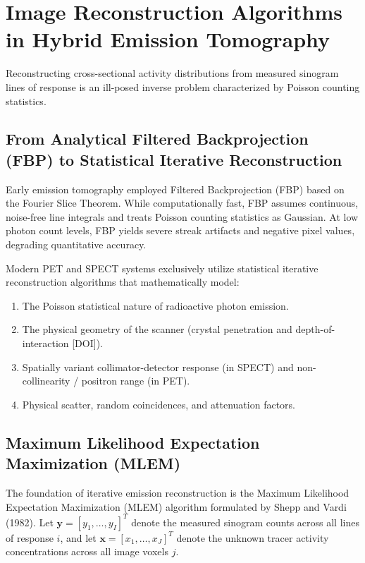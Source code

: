 \documentclass[11pt,a4paper]{article}
\begin{document}
\section{Image Reconstruction Algorithms in Hybrid Emission Tomography}
Reconstructing cross-sectional activity distributions from measured sinogram lines of response is an ill-posed inverse problem characterized by Poisson counting statistics.

\subsection{From Analytical Filtered Backprojection (FBP) to Statistical Iterative Reconstruction}
Early emission tomography employed Filtered Backprojection (FBP) based on the Fourier Slice Theorem. While computationally fast, FBP assumes continuous, noise-free line integrals and treats Poisson counting statistics as Gaussian. At low photon count levels, FBP yields severe streak artifacts and negative pixel values, degrading quantitative accuracy.

Modern PET and SPECT systems exclusively utilize statistical iterative reconstruction algorithms that mathematically model:
\begin{enumerate}
    \item The Poisson statistical nature of radioactive photon emission.
    \item The physical geometry of the scanner (crystal penetration and depth-of-interaction [DOI]).
    \item Spatially variant collimator-detector response (in SPECT) and non-collinearity / positron range (in PET).
    \item Physical scatter, random coincidences, and attenuation factors.
\end{enumerate}

\subsection{Maximum Likelihood Expectation Maximization (MLEM)}
The foundation of iterative emission reconstruction is the Maximum Likelihood Expectation Maximization (MLEM) algorithm formulated by Shepp and Vardi (1982). Let $\mathbf{y} = [y_1, \dots, y_I]^T$ denote the measured sinogram counts across all lines of response $i$, and let $\mathbf{x} = [x_1, \dots, x_J]^T$ denote the unknown tracer activity concentrations across all image voxels $j$.
\end{document}
